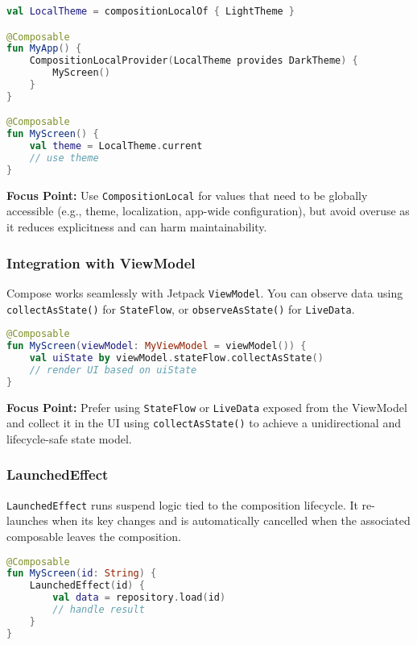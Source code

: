 \documentclass[a4paper,12pt]{article}
\begin{document}
\begin{lstlisting}[language=Kotlin]
val LocalTheme = compositionLocalOf { LightTheme }

@Composable
fun MyApp() {
    CompositionLocalProvider(LocalTheme provides DarkTheme) {
        MyScreen()
    }
}

@Composable
fun MyScreen() {
    val theme = LocalTheme.current
    // use theme
}
\end{lstlisting}

\textbf{Focus Point:} Use \texttt{CompositionLocal} for values that need to be globally accessible (e.g., theme, localization, app-wide configuration), but avoid overuse as it reduces explicitness and can harm maintainability.

\subsubsection{Integration with ViewModel}

Compose works seamlessly with Jetpack \texttt{ViewModel}. You can observe data using \texttt{collectAsState()} for \texttt{StateFlow}, or \texttt{observeAsState()} for \texttt{LiveData}.

\begin{lstlisting}[language=Kotlin]
@Composable
fun MyScreen(viewModel: MyViewModel = viewModel()) {
    val uiState by viewModel.stateFlow.collectAsState()
    // render UI based on uiState
}
\end{lstlisting}

\textbf{Focus Point:} Prefer using \texttt{StateFlow} or \texttt{LiveData} exposed from the ViewModel and collect it in the UI using \texttt{collectAsState()} to achieve a unidirectional and lifecycle-safe state model.

\subsubsection{LaunchedEffect}

\texttt{LaunchedEffect} runs suspend logic tied to the composition lifecycle. It re-launches when its key changes and is automatically cancelled when the associated composable leaves the composition.

\begin{lstlisting}[language=Kotlin]
@Composable
fun MyScreen(id: String) {
    LaunchedEffect(id) {
        val data = repository.load(id)
        // handle result
    }
}
\end{lstlisting}
\end{document}
